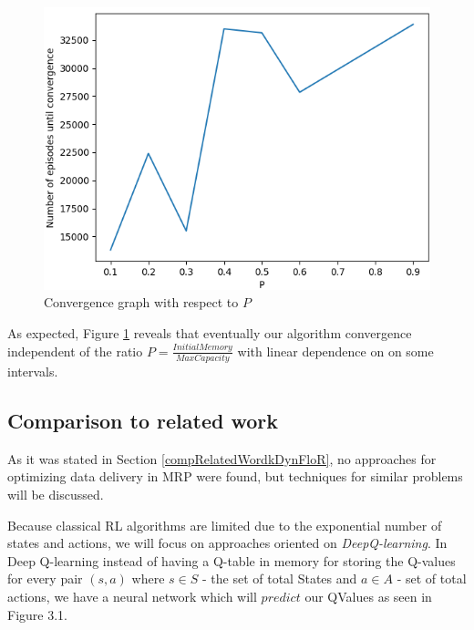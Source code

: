 \begin{figure}[!htb]
\centering
\includegraphics[scale=0.7]{Figures/convergenceGraph1.png}
\caption{Convergence graph with respect to $P$}
\label{convergenceFig}
\end{figure}

As expected, Figure \ref{convergenceFig} reveals that eventually our algorithm convergence independent of the ratio $P=\frac{InitialMemory}{MaxCapacity}$ with linear dependence on on some intervals.


\subsection{Comparison to related work}
As it was stated in Section \ref{compRelatedWordkDynFloR}, no approaches for optimizing data delivery in MRP were found, but techniques for similar problems will be discussed.

Because classical RL algorithms are limited due to the exponential number of states and actions, we will focus on approaches oriented on \emph{DeepQ-learning}. In Deep Q-learning instead of having a Q-table in memory for storing the Q-values for every pair $(s,a)$ where $s \in S$ - the set of total States and $a \in A$ - set of total actions, we have a neural network which will $predict$ our QValues as seen in Figure 3.1.

